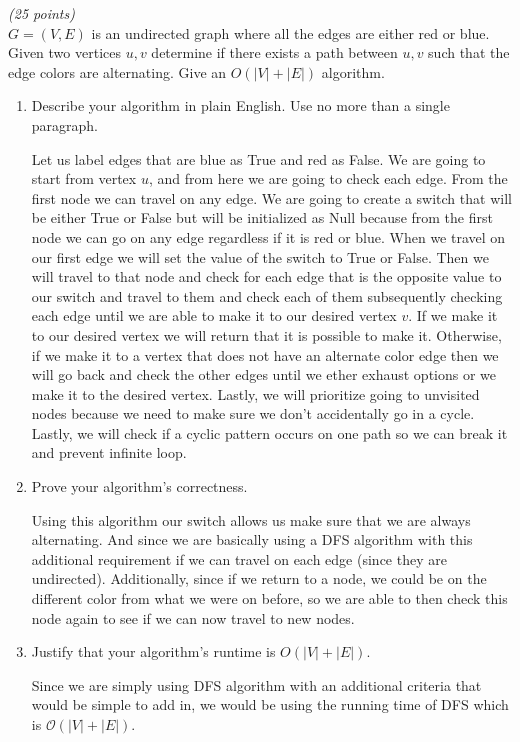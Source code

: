 \documentclass{article}
\renewcommand{\O}{\mathcal{O}}
\newcounter{ProblemCounter}
\newenvironment{problem}[1][Problem]{
 \begin{trivlist}
 \item[\hskip \labelsep {\bfseries #1}\hskip \labelsep {%
 \bfseries \theProblemCounter.%
 \stepcounter{ProblemCounter}%
 }]
}{
 \end{trivlist}
}
\begin{document}
\pagebreak

\begin{problem}\textit{(25 points)}\\
$G=(V, E)$ is an undirected graph where all the edges are either red or blue.  Given two vertices $u, v$ determine if there exists a path between $u, v$ such that the edge colors are alternating.  Give an $O(|V|+|E|)$ algorithm.
\begin{enumerate}[label=\textbf{\alph*.)}]
\item Describe your algorithm in plain English.  Use no more than a single paragraph.

Let us label edges that are blue as True and red as False. We are going to start from vertex $u$, and from here we are going to check each edge. From the first node we can travel on any edge. We are going to create a switch that will be either True or False but will be initialized as Null because from the first node we can go on any edge regardless if it is red or blue. When we travel on our first edge we will set the value of the switch to True or False. Then we will travel to that node and check for each edge that is the opposite value to our switch and travel to them and check each of them subsequently checking each edge until we are able to make it to our desired vertex $v.$ If we make it to our desired vertex we will return that it is possible to make it. Otherwise, if we make it to a vertex that does not have an alternate color edge then we will go back and check the other edges until we ether exhaust options or we make it to the desired vertex. Lastly, we will prioritize going to unvisited nodes because we need to make sure we don't accidentally go in a cycle. Lastly, we will check if a cyclic pattern occurs on one path so we can break it and prevent infinite loop.

\item Prove your algorithm's correctness.

Using this algorithm our switch allows us make sure that we are always alternating. And since we are basically using a DFS algorithm with this additional requirement if we can travel on each edge (since they are undirected). Additionally, since if we return to a node, we could be on the different color from what we were on before, so we are able to then check this node again to see if we can now travel to new nodes.

\item Justify that your algorithm's runtime is  $O(|V|+|E|)$. 

Since we are simply using DFS algorithm with an additional criteria that would be simple to add in, we would be using the running time of DFS which is $\O(|V| + |E|).$

\end{enumerate}
\end{problem}
\end{document}
